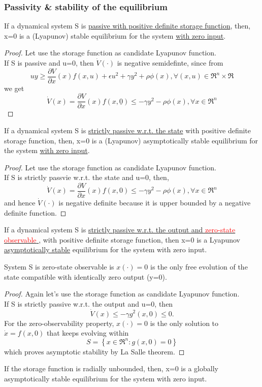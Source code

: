 \subsubsection{Passivity \& stability of the equilibrium}
\begin{thm}
	If a dynamical system S is \underline{passive with positive definite storage function}, then, x=0 is a (Lyapunov) stable equilibrium for the system \underline{with zero input}.
\end{thm}
\begin{proof}
	Let use the storage function as candidate Lyapunov function. \\If S is passive and u=0, then $\dot{V}(\cdot)$ is negative semidefinte, since from \[
	uy\ge\frac{\partial V}{\partial x}(x)f(x,u)+\epsilon u^2+\gamma y^2+\rho\phi(x),\forall(x,u)\in \Re^n\times\Re
	\] we get \[\dot{V}(x)=\frac{\partial V}{\partial x}(x)f(x,\underline{0})\le-\gamma y^2-\rho \phi(x),\forall x \in \Re^n\]
\end{proof}
\begin{thm}
	If a dynamical system S is \underline{strictly passive w.r.t. the state} with positive definite storage function, then, x=0 is a (Lyapunov) asymptotically stable equilibrium for the system \underline{with zero input}.
\end{thm}
\begin{proof}
	Let use the storage function as candidate Lyapunov function.\\
	If S is strictly passvie w.r.t. the state and u=0, then, 	\[\dot{V}(x)=\frac{\partial V}{\partial x}(x)f(x,0)\le -\gamma y^2-\rho\phi(x), \forall x \in \Re^n\] and hence $\dot{V}(\cdot)$ is negative definite because it is upper bounded by a negative definite function.
\end{proof}
\begin{thm}
	If a dynamical system S is \underline{strictly passive w.r.t. the output and \textcolor{red}{zero-state observable} }, with positive definite storage function, then x=0 is a Lyapunov \underline{asymptotically stable} equilibrium for the system with zero input.
\end{thm}
\begin{defn}
	System S is zero-state observable is $x(\cdot)=0$ is the only free evolution of the state compatible with identically zero output (y=0).
\end{defn}
\begin{proof}
	Again let's use the storage function as candidate Lyapunov function.\\ If S is strictly passive w.r.t. the output and u=0, then \[\dot{V}(x)\le-\gamma g^2(x,0)\le 0.\]For the zero-observability property, $x(\cdot)=0$ is the only solution to $\dot{x}=f(x,0)$ that keeps evolving within \[S=\left\{x\in \Re^n\colon g(x,0)=0\right\}\] which proves asymptotic stability by La Salle theorem.
\end{proof}
\begin{note}
	If the storage function is radially unbounded, then, x=0 is a globally asymptotically stable equilibrium for the system with zero input.
\end{note}
